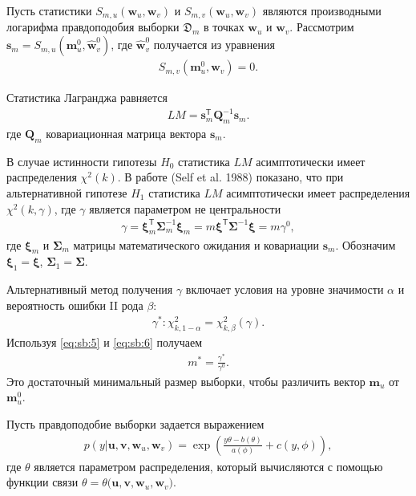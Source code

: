 Пусть статистики $S_{m,u}\left(\textbf{w}_{u}, \textbf{w}_{v}\right)$ и $S_{m,v}\left(\textbf{w}_{u}, \textbf{w}_{v}\right)$ являются производными логарифма правдоподобия выборки $\mathfrak{D}_{m}$ в точках $\textbf{w}_{u}$ и $\textbf{w}_{v}$.
Рассмотрим $\textbf{s}_{m} = S_{m,u}\left(\textbf{m}^{0}_{u}, \hat{\textbf{w}}^{0}_{v}\right)$, где $\hat{\textbf{w}}^{0}_{v}$ получается из уравнения
\[
\label{eq:sb:3}
\begin{aligned}
	S_{m,v}\left(\textbf{m}^{0}_{u}, \textbf{w}_{v}\right) = 0.
\end{aligned}
\]

Статистика Лагранджа равняется
\[
\label{eq:sb:4}
\begin{aligned}
	LM = \textbf{s}^{\mathsf{T}}_{m}\textbf{Q}_{m}^{-1}\textbf{s}_{m}.
\end{aligned}
\]
где $\textbf{Q}_{m}$ ковариационная матрица вектора $\textbf{s}_{m}$.
	
В случае истинности гипотезы $H_0$ статистика $LM$ асимптотически имеет распределения $\chi^2(k)$.  В работе (Self et al. 1988) показано, что при альтернативной гипотезе $H_1$ статистика  $LM$ асимптотически имеет распределения $\chi^2(k,\gamma)$, где $\gamma$ является параметром не центральности
\[
\label{eq:sb:5}
\begin{aligned}
	\gamma = \bm{\xi}_{m}^{\mathsf{T}}\bm{\Sigma}^{-1}_{m}\bm{\xi}_{m} = m\bm{\xi}^{\mathsf{T}}\bm{\Sigma}^{-1}\bm{\xi}= m\gamma^0,
\end{aligned}
\]
где $\bm{\xi}_{m}$ и $\bm{\Sigma}_{m}$ матрицы математического ожидания и ковариации $\textbf{s}_{m}$. Обозначим $\bm{\xi}_1 = \bm{\xi}$,  $\bm{\Sigma}_1 = \bm{\Sigma}$. 
	
Альтернативный метод получения $\gamma$ включает условия на уровне значимости $\alpha$ и вероятность ошибки II рода $\beta$:
\[
\label{eq:sb:6}
\begin{aligned}
	\gamma^*:\chi^2_{k, 1-\alpha} = \chi^2_{k, \beta}\left(\gamma\right).
\end{aligned}
\]
Используя \eqref{eq:sb:5} и \eqref{eq:sb:6} получаем
\[
\label{eq:sb:7}
\begin{aligned}
	m^* = \frac{\gamma^*}{\gamma^0}.
\end{aligned}
\]
Это достаточный минимальный размер выборки, чтобы различить вектор $\textbf{m}_{u}$ от $\textbf{m}^0_{u}$.

Пусть правдоподобие выборки задается выражением
\[
\label{eq:sb:8}
\begin{aligned}
	p(y|\textbf{u},\textbf{v},\textbf{w}_{u},\textbf{w}_{v}) = \exp\left(\frac{y\theta- b(\theta)}{a(\phi)} + c\left(y, \phi\right)\right),
\end{aligned}
\]
где $\theta$ является параметром распределения, который вычисляются с помощью функции связи $\theta=\theta\bigr(\textbf{u},\textbf{v},\textbf{w}_{u},\textbf{w}_{v}\bigr)$.


